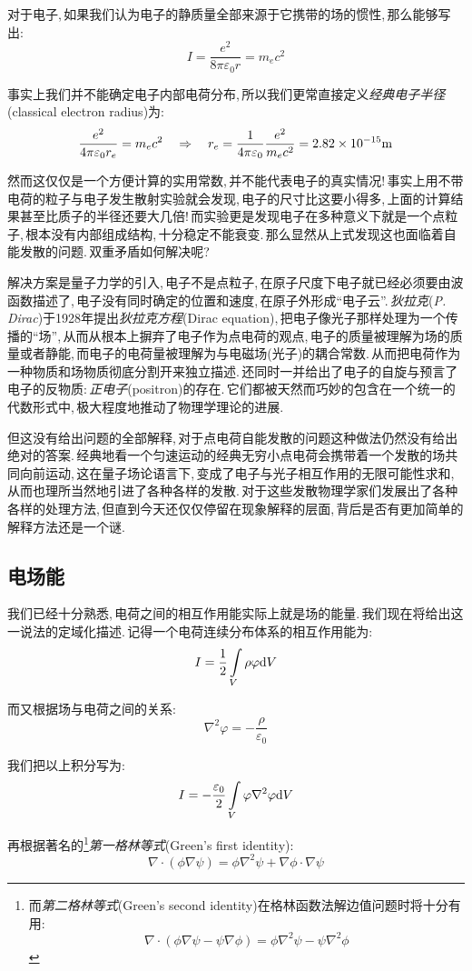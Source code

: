 对于电子,\,如果我们认为电子的静质量全部来源于它携带的场的惯性,\,那么能够写出:
\[I=\frac{e^2}{8\pi\varepsilon_0 r}=m_e c^2\]

事实上我们并不能确定电子内部电荷分布,\,所以我们更常直接定义\emph{经典电子半径}(classical electron radius)为:
\[\frac{e^2}{4\pi\varepsilon_0 r_e}=m_e c^2\quad \Rightarrow \quad r_e=\frac{1}{4\pi\varepsilon_0} \frac{e^2}{m_e c^2}=2.82\times 10^{-15} {\rm m}\]

然而这仅仅是一个方便计算的实用常数,\,并不能代表电子的真实情况!\,事实上用不带电荷的粒子与电子发生散射实验就会发现,\,电子的尺寸比这要小得多,\,上面的计算结果甚至比质子的半径还要大几倍!\,而实验更是发现电子在多种意义下就是一个点粒子,\,根本没有内部组成结构,\,十分稳定不能衰变.\,那么显然从上式发现这也面临着自能发散的问题.\,双重矛盾如何解决呢?

解决方案是量子力学的引入,\,电子不是点粒子,\,在原子尺度下电子就已经必须要由波函数描述了,\,电子没有同时确定的位置和速度,\,在原子外形成``电子云''.\,\emph{狄拉克}({\it P. Dirac})于1928年提出\emph{狄拉克方程}(Dirac equation),\,把电子像光子那样处理为一个传播的``场'',\,从而从根本上摒弃了电子作为点电荷的观点,\,电子的质量被理解为场的质量或者静能,\,而电子的电荷量被理解为与电磁场(光子)的耦合常数.\,从而把电荷作为一种物质和场物质彻底分割开来独立描述.\,还同时一并给出了电子的自旋与预言了电子的反物质:\,\emph{正电子}(positron)的存在.\,它们都被天然而巧妙的包含在一个统一的代数形式中,\,极大程度地推动了物理学理论的进展.

但这没有给出问题的全部解释,\,对于点电荷自能发散的问题这种做法仍然没有给出绝对的答案.\,经典地看一个匀速运动的经典无穷小点电荷会携带着一个发散的场共同向前运动,\,这在量子场论语言下,\,变成了电子与光子相互作用的无限可能性求和,\,从而也理所当然地引进了各种各样的发散.\,对于这些发散物理学家们发展出了各种各样的处理方法,\,但直到今天还仅仅停留在现象解释的层面,\,背后是否有更加简单的解释方法还是一个谜.


\subsection{电场能}

我们已经十分熟悉,\,电荷之间的相互作用能实际上就是场的能量.\,我们现在将给出这一说法的定域化描述.\,记得一个电荷连续分布体系的相互作用能为:
\[I=\frac{1}{2}\int\limits_V \rho\varphi\textrm{d} V\]

而又根据场与电荷之间的关系:
\[\nabla^2 \varphi=-\frac{\rho}{\varepsilon_0}\]

我们把以上积分写为:
\[I=-\frac{\varepsilon_0}{2}\int\limits_V \varphi\nabla^2\varphi\textrm{d} V\]

再根据著名的\footnote{而\emph{第二格林等式}(Green's second identity)在格林函数法解边值问题时将十分有用:
\[\nabla\cdot(\phi\nabla\psi-\psi\nabla\phi)=\phi\nabla^2\psi-\psi\nabla^2\phi\]}\emph{第一格林等式}(Green's first identity):
\[\nabla\cdot(\phi\nabla\psi)=\phi\nabla^2\psi+\nabla\phi\cdot\nabla\psi\]

